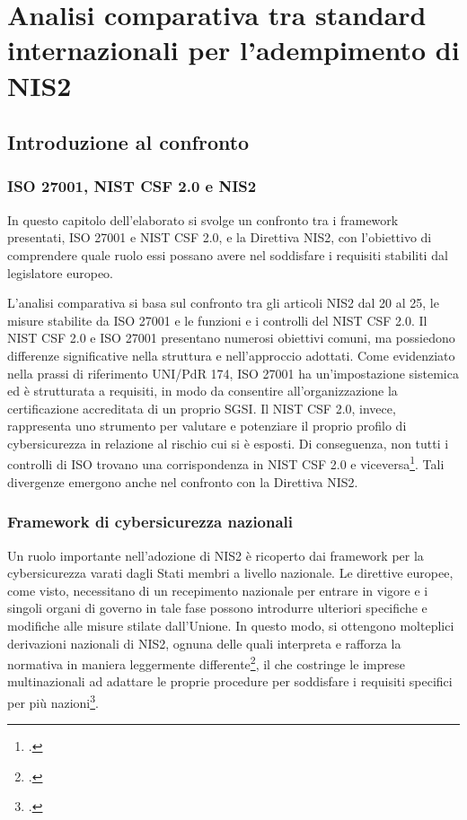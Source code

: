 \chapter{Analisi comparativa tra standard internazionali per l'adempimento di NIS2}
\label{cap:confronto}

\section{Introduzione al confronto}
\subsection{ISO 27001, NIST CSF 2.0 e NIS2}
In questo capitolo dell'elaborato si svolge un confronto tra i framework presentati,
ISO 27001 e NIST CSF 2.0, e la Direttiva NIS2, con l'obiettivo di comprendere quale
ruolo essi possano avere nel soddisfare i requisiti stabiliti dal legislatore europeo.

L'analisi comparativa si basa sul confronto tra gli articoli NIS2 dal 20 al 25, le misure stabilite 
da ISO 27001 e le funzioni e i controlli del NIST CSF 2.0.
Il NIST CSF 2.0 e ISO 27001 presentano numerosi obiettivi comuni, ma possiedono differenze
significative nella struttura e nell'approccio adottati. Come evidenziato nella 
prassi di riferimento UNI/PdR 174, ISO 27001 ha un'impostazione sistemica ed è
strutturata a requisiti, in modo da consentire all'organizzazione la certificazione 
accreditata di un proprio SGSI. Il NIST CSF 2.0, invece, rappresenta uno strumento
per valutare e potenziare il proprio profilo di cybersicurezza in relazione al rischio
cui si è esposti. Di conseguenza, non tutti i controlli di ISO trovano una corrispondenza
in NIST CSF 2.0 e viceversa\footcite{uni-pdr174}. Tali divergenze emergono anche nel 
confronto con la Direttiva NIS2.


\subsection{Framework di cybersicurezza nazionali}
Un ruolo importante nell'adozione di NIS2 è ricoperto dai framework per la cybersicurezza varati
dagli Stati membri a livello nazionale. Le direttive europee, come visto, necessitano di un recepimento
nazionale per entrare in vigore e i singoli organi di governo in tale fase possono introdurre
ulteriori specifiche e modifiche alle misure stilate dall'Unione. In questo modo, si ottengono molteplici
derivazioni nazionali di NIS2, ognuna delle quali interpreta e rafforza la normativa in maniera leggermente
differente\footcite[p. 5]{parmar-miles-csf}, il che costringe le imprese multinazionali ad
adattare le proprie procedure per soddisfare i requisiti specifici per più nazioni\footcite[p. 18]{ecso-whitepaper-nis2}.

